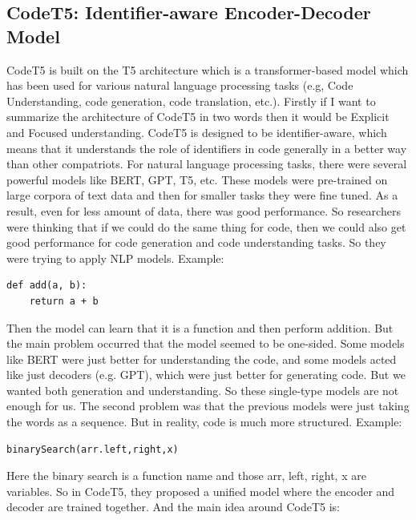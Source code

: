\documentclass[12pt]{article}
\begin{document}
\subsection{CodeT5: Identifier-aware Encoder-Decoder Model}
CodeT5 is built on the T5 architecture which is a transformer-based model which has been used for various natural language processing tasks  (e.g, Code Understanding, code generation, code translation, etc.). Firstly if I want to summarize the architecture of CodeT5 in two words then it would be Explicit and Focused understanding. CodeT5 is designed to be identifier-aware, which means that it understands the role of identifiers in code generally in a better way than other compatriots.
For natural language processing tasks, there were several powerful models like BERT, GPT, T5, etc. These models were pre-trained on large corpora of text data and then for smaller tasks they were fine tuned. As a result, even for less amount of data, there was good performance. So researchers were thinking that if we could do the same thing for code, then we could also get good performance for code generation and code understanding tasks. So they were trying to apply NLP models. Example:
\begin{lstlisting}
def add(a, b):
    return a + b
\end{lstlisting}
Then the model can learn that it is a function and then perform addition. But the main problem occurred that the model seemed to be one-sided. Some models like BERT were just better for understanding the code, and some models acted like just decoders (e.g. GPT), which were just better for generating code. But we wanted both generation and understanding. So these single-type models are not enough for us. The second problem was that the previous models were just taking the words as a sequence. But in reality, code is much more structured. Example:
\begin{lstlisting}
binarySearch(arr.left,right,x)
\end{lstlisting}
Here the binary search is a function name and those arr, left, right, x are variables. So in CodeT5, they proposed a unified model where the encoder and decoder are trained together. And the main idea around CodeT5 is:
\end{document}

